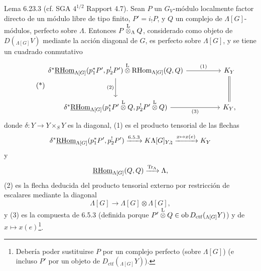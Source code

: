 \begin{statement}{Lema 6.23.3}
(cf. SGA $4^{1/2}$ Rapport 4.7). Sean $P$ un $G_V$-módulo localmente factor directo de un módulo libre de tipo finito, $P'=i_!P$, y $Q$ un complejo de $\Lambda[G]$-módulos, perfecto sobre $\Lambda$. Entonces $P\overset{\mathrm L}{\otimes}_{\Lambda}Q$, considerado como objeto de $D({}_{\Lambda[G]}V)$ mediante la acción diagonal de $G$, es perfecto sobre $\Lambda[G]$, y se tiene un cuadrado conmutativo
\begin{equation}
\tag{*}
\begin{tikzcd}[column sep=huge,row sep=large]
\delta^*\uRHom_{\Lambda[G]}(p_1^*P',p_2^!P')\lten
\RHom_{\Lambda[G]}(Q,Q) \arrow[r,"(1)"] \arrow[d,"(2)"']
& K_Y \arrow[d,equal]\\
\delta^*\uRHom_{\Lambda[G]}(p_1^*P'\lten Q,p_2^!P'\lten Q) \arrow[r,"(3)"']
& K_Y ,
\end{tikzcd}
\end{equation}
donde $\delta:Y\to Y\times_SY$ es la diagonal, (1) es el producto tensorial de las flechas
\[
\delta^*\underline{\mathrm{RHom}}_{\Lambda[G]}(p_1^*P',p_2^!P')\xrightarrow{6.5.3}
K\Lambda[G]_{Y,\natural}\xrightarrow{x\mapsto x(e)}K_Y
\]
y
\[
\underline{\mathrm{RHom}}_{\Lambda[G]}(Q,Q)\xrightarrow{\operatorname{Tr}_{\Lambda}}\Lambda,
\]
(2) es la flecha deducida del producto tensorial externo por restricción de escalares mediante la diagonal
\[
\Lambda[G]\to\Lambda[G]\otimes\Lambda[G],
\]
y (3) es la compuesta de 6.5.3 (definida porque $P'\overset{\mathrm L}{\otimes} Q\in\operatorname{ob} D_{\mathrm{ctf}}({}_{\Lambda[G]}Y)$) y de $x\mapsto x(e)$\footnote{Debería poder sustituirse $P$ por un complejo perfecto (sobre $\Lambda[G]$) (e incluso $P'$ por un objeto de $D_{\mathrm{ctf}}({}_{\Lambda[G]}Y)$).}.
\end{statement}

